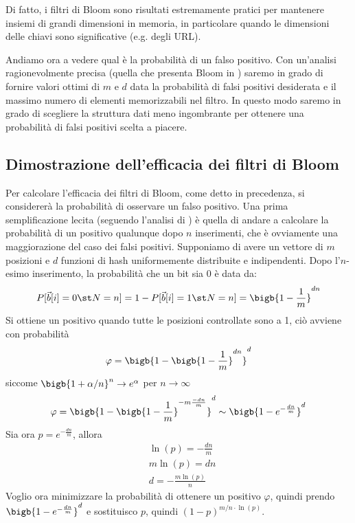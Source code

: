 Di fatto, i filtri di Bloom sono risultati estremamente pratici per mantenere insiemi di grandi dimensioni in memoria, in particolare quando le dimensioni delle chiavi sono significative (e.g. degli URL).

Andiamo ora a vedere qual è la probabilità di un falso positivo. Con un'analisi ragionevolmente precisa (quella che presenta Bloom in \cite{Bloom}) saremo in grado di fornire valori ottimi di $m$ e $d$ data la probabilità di falsi positivi desiderata e il massimo numero di elementi memorizzabili nel filtro. In questo modo saremo in grado di scegliere la struttura dati meno ingombrante per ottenere una probabilità di falsi positivi scelta a piacere.

\subsection{Dimostrazione dell'efficacia dei filtri di Bloom}
Per calcolare l'efficacia dei filtri di Bloom, come detto in precedenza, si considererà la probabilità di osservare un falso positivo. Una prima semplificazione lecita (seguendo l'analisi di \cite{Bloom}) è quella di andare a calcolare la probabilità di un positivo qualunque dopo $n$ inserimenti, che è ovviamente una maggiorazione del caso dei falsi positivi.
Supponiamo di avere un vettore di $m$ posizioni e $d$ funzioni di hash uniformemente distribuite e indipendenti. Dopo l'$n$-esimo inserimento, la probabilità che un bit sia 0 è data da:
\begin{equation*}
    P[\vec{b}[i] = 0 \st N = n] = 1 - P[\vec{b}[i] = 1 \st N = n] = \bigb{1 - \frac{1}{m}}^{dn}
\end{equation*}
Si ottiene un positivo quando tutte le posizioni controllate sono a 1, ciò avviene con probabilità
\begin{equation*}
    \varphi = \bigb{1 - \bigb{1 - \frac{1}{m}}^{dn}}^d
\end{equation*}
siccome $\bigb{1 + \alpha/n}^n \rightarrow e^{\alpha}$ per $n \rightarrow \infty$
\begin{equation*}
    \varphi = \bigb{1 - \bigb{1 - \frac{1}{m}}^{-m \frac{-dn}{m}}}^d \sim \bigb{1 - e^{-\frac{dn}{m}}}^d
\end{equation*}
Sia ora $p = e^{-\frac{dn}{m}}$, allora
\begin{align*}
    &\ln(p) = -\frac{dn}{m}\\
    &m\ln(p) = dn\\
    &d = -\frac{m\ln(p)}{n}
\end{align*}
Voglio ora minimizzare la probabilità di ottenere un positivo $\varphi$, quindi prendo $\bigb{1 - e^{-\frac{dn}{m}}}^d$ e sostituisco $p$, quindi $(1 - p)^{m/n \cdot \ln(p)}$.\\
